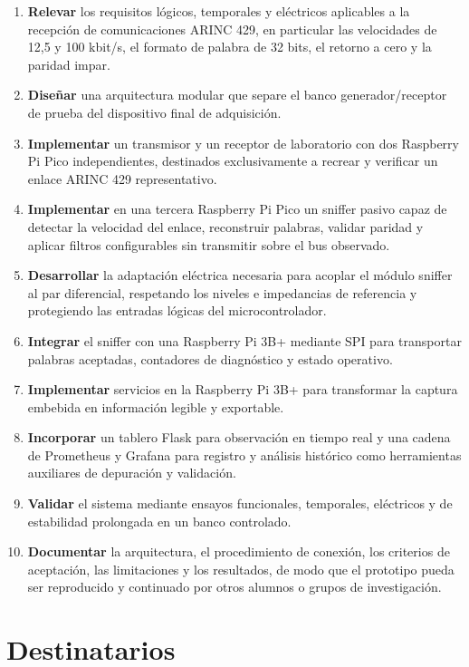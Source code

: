 \documentclass[12pt,a4paper,oneside]{article}
\begin{document}
\begin{enumerate}
  \item \textbf{Relevar} los requisitos lógicos, temporales y eléctricos aplicables a la recepción de comunicaciones ARINC 429, en particular las velocidades de 12,5 y 100 kbit/s, el formato de palabra de 32 bits, el retorno a cero y la paridad impar.
  \item \textbf{Diseñar} una arquitectura modular que separe el banco generador/receptor de prueba del dispositivo final de adquisición.
  \item \textbf{Implementar} un transmisor y un receptor de laboratorio con dos Raspberry Pi Pico independientes, destinados exclusivamente a recrear y verificar un enlace ARINC 429 representativo.
  \item \textbf{Implementar} en una tercera Raspberry Pi Pico un sniffer pasivo capaz de detectar la velocidad del enlace, reconstruir palabras, validar paridad y aplicar filtros configurables sin transmitir sobre el bus observado.
  \item \textbf{Desarrollar} la adaptación eléctrica necesaria para acoplar el módulo sniffer al par diferencial, respetando los niveles e impedancias de referencia y protegiendo las entradas lógicas del microcontrolador.
  \item \textbf{Integrar} el sniffer con una Raspberry Pi 3B+ mediante SPI para transportar palabras aceptadas, contadores de diagnóstico y estado operativo.
  \item \textbf{Implementar} servicios en la Raspberry Pi 3B+ para transformar la captura embebida en información legible y exportable.
  \item \textbf{Incorporar} un tablero Flask para observación en tiempo real y una cadena de Prometheus y Grafana para registro y análisis histórico como herramientas auxiliares de depuración y validación.
  \item \textbf{Validar} el sistema mediante ensayos funcionales, temporales, eléctricos y de estabilidad prolongada en un banco controlado.
  \item \textbf{Documentar} la arquitectura, el procedimiento de conexión, los criterios de aceptación, las limitaciones y los resultados, de modo que el prototipo pueda ser reproducido y continuado por otros alumnos o grupos de investigación.
\end{enumerate}

\section{Destinatarios}
\end{document}
